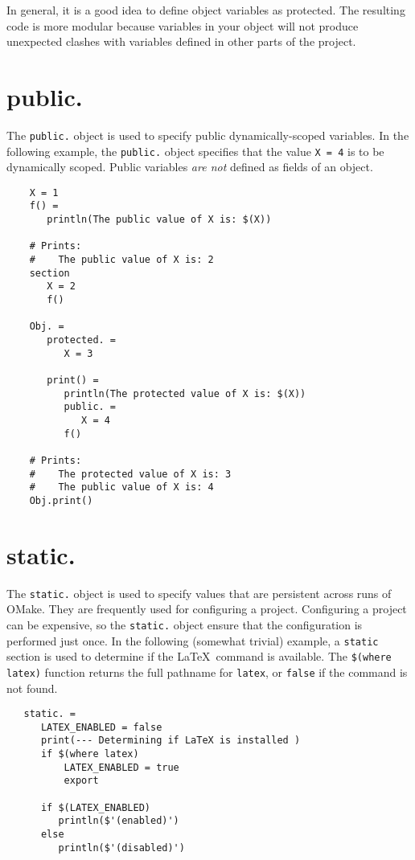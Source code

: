 In general, it is a good idea to define object variables as protected.  The resulting code is more
modular because variables in your object will not produce unexpected clashes with variables defined
in other parts of the project.

\section{public.}

The \verb+public.+ object is used to specify public dynamically-scoped variables.  In the following
example, the \verb+public.+ object specifies that the value \verb+X = 4+ is to be dynamically
scoped.  Public variables \emph{are not} defined as fields of an object.

\begin{verbatim}
    X = 1
    f() =
       println(The public value of X is: $(X))

    # Prints:
    #    The public value of X is: 2
    section
       X = 2
       f()

    Obj. =
       protected. =
          X = 3

       print() =
          println(The protected value of X is: $(X))
          public. =
             X = 4
          f()

    # Prints:
    #    The protected value of X is: 3
    #    The public value of X is: 4
    Obj.print()
\end{verbatim}

\section{static.}

The \verb+static.+ object is used to specify values that are persistent across runs of OMake.  They
are frequently used for configuring a project.  Configuring a project can be expensive, so the
\verb+static.+ object ensure that the configuration is performed just once.  In the following
(somewhat trivial) example, a \verb+static+ section is used to determine if the \LaTeX\ command is
available.  The \verb+$(where latex)+ function returns the full pathname for \verb+latex+, or
\verb+false+ if the command is not found.

\begin{verbatim}
   static. =
      LATEX_ENABLED = false
      print(--- Determining if LaTeX is installed )
      if $(where latex)
          LATEX_ENABLED = true
          export

      if $(LATEX_ENABLED)
         println($'(enabled)')
      else
         println($'(disabled)')
\end{verbatim}

